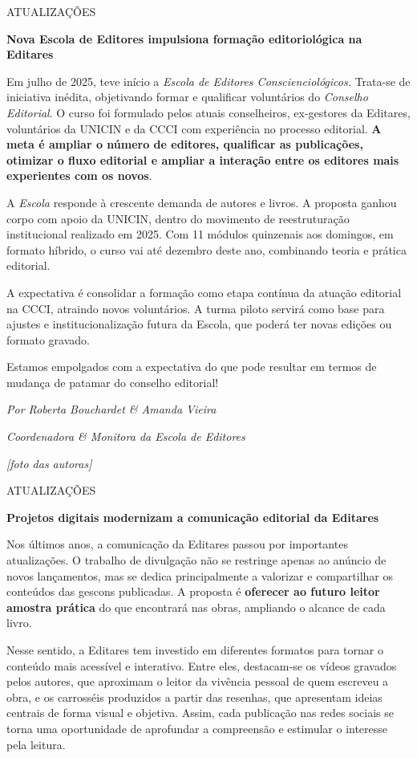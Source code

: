 ATUALIZAÇÕES

\textbf{Nova Escola de Editores impulsiona formação editoriológica na Editares}

Em julho de 2025, teve início a \emph{Escola de Editores Conscienciológicos.} Trata-se de iniciativa inédita, objetivando formar e qualificar voluntários do \emph{Conselho Editorial}. O curso foi formulado pelos atuais conselheiros, ex-gestores da Editares, voluntários da UNICIN e da CCCI com experiência no processo editorial. \textbf{A meta é ampliar o número de editores, qualificar as publicações, otimizar o fluxo editorial e ampliar a interação entre os editores mais experientes com os novos}.

A \emph{Escola} responde à crescente demanda de autores e livros. A proposta ganhou corpo com apoio da UNICIN, dentro do movimento de reestruturação institucional realizado em 2025. Com 11 módulos quinzenais aos domingos, em formato híbrido, o curso vai até dezembro deste ano, combinando teoria e prática editorial.

A expectativa é consolidar a formação como etapa contínua da atuação editorial na CCCI, atraindo novos voluntários. A turma piloto servirá como base para ajustes e institucionalização futura da Escola, que poderá ter novas edições ou formato gravado.

Estamos empolgados com a expectativa do que pode resultar em termos de mudança de patamar do conselho editorial!

\emph{Por Roberta Bouchardet \& Amanda Vieira}

\emph{Coordenadora \& Monitora da Escola de Editores}

\emph{{[}foto das autoras{]}}

ATUALIZAÇÕES

\textbf{Projetos digitais modernizam a comunicação editorial da Editares}

Nos últimos anos, a comunicação da Editares passou por importantes atualizações. O trabalho de divulgação não se restringe apenas ao anúncio de novos lançamentos, mas se dedica principalmente a valorizar e compartilhar os conteúdos das gescons publicadas. A proposta é \textbf{oferecer ao futuro leitor amostra prática} do que encontrará nas obras, ampliando o alcance de cada livro.

Nesse sentido, a Editares tem investido em diferentes formatos para tornar o conteúdo mais acessível e interativo. Entre eles, destacam-se os vídeos gravados pelos autores, que aproximam o leitor da vivência pessoal de quem escreveu a obra, e os carrosséis produzidos a partir das resenhas, que apresentam ideias centrais de forma visual e objetiva. Assim, cada publicação nas redes sociais se torna uma oportunidade de aprofundar a compreensão e estimular o interesse pela leitura.

